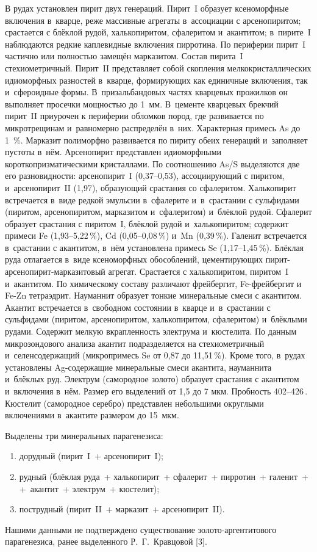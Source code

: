В рудах установлен пирит двух генераций. Пирит~I образует ксеноморфные включения в~кварце, реже массивные агрегаты в~ассоциации с арсенопиритом; срастается с блёклой рудой, халькопиритом, сфалеритом и~акантитом; в~пирите~I наблюдаются редкие каплевидные включения пирротина. По периферии пирит~I частично или полностью замещён марказитом. Состав пирита~I стехиометричный. Пирит~II представляет собой скопления мелкокристаллических идиоморфных разностей в~кварце, формирующих как единичные включения, так и~сфероидные формы. В~призальбандовых частях кварцевых прожилков он выполняет просечки мощностью до 1~мм. В~цементе кварцевых брекчий пирит~II приурочен к периферии обломков пород, где развивается по микротрещинам и~равномерно распределён в~них. Характерная примесь As до 1~\%. Марказит полиморфно развивается по пириту обеих генераций и~заполняет пустоты в~нём. Арсенопирит представлен идиоморфными короткопризматическими кристаллами. По соотношению As/S выделяются две его разновидности: арсенопирит~I (0,37--0,53), ассоциирующий с пиритом, и~арсенопирит~II (1,97), образующий срастания со сфалеритом. Халькопирит встречается в~виде редкой эмульсии в~сфалерите и~в~срастании с сульфидами (пиритом, арсенопиритом, марказитом и~сфалеритом) и~блёклой рудой. Сфалерит образует срастания с пиритом~I, блёклой рудой и~халькопиритом; содержит примеси Fe (1,93--5,22\,\%), Cd (0,05--0,08\,\%) и~Mn (0,39\,\%). Галенит встречается в~срастании с акантитом, в~нём установлена примесь Se (1,17--1,45\,\%). Блёклая руда отлагается в~виде ксеноморфных обособлений, цементирующих пирит-арсенопирит-марказитовый агрегат. Срастается с халькопиритом, пиритом~I и~акантитом. По химическому составу различают фрейбергит, Fe-фрейбергит и Fe-Zn тетраэдрит. Науманнит образует тонкие минеральные смеси с акантитом. Акантит встречается в~свободном состоянии в~кварце и~в~срастании с сульфидами (пиритом, арсенопиритом, халькопиритом, сфалеритом) и~блёклыми рудами. Содержит мелкую вкрапленность электрума и~кюстелита. По данным микрозондового анализа акантит подразделяется на стехиометричный и~селенсодержащий (микропримесь Se от 0,87 до 11,51\,\%). Кроме того, в~рудах установлены Ag-содержащие минеральные смеси акантита, науманнита и~блёклых руд. Электрум (самородное золото) образует срастания с акантитом и~включения в~нём. Размер его выделений от 1,5 до 7 мкм. Пробность 402--426\,\permil. Кюстелит (самородное серебро) представлен небольшими округлыми включениями в~акантите размером до 15~мкм.

Выделены три минеральных парагенезиса:
\begin{enumerate}[noitemsep]\vspace{-6pt}
  \item дорудный (пирит~I~+ арсенопирит~I);
  \item рудный (блёклая руда~+ халькопирит~+ сфалерит~+ пирротин~+ галенит~+\\+~акантит~+ электрум~+ кюстелит);
  \item пострудный (пирит~II~+ марказит~+ арсенопирит~II).
\end{enumerate}
 \vspace{-6pt}Нашими данными не подтверждено существование золото-аргентитового парагенезиса, ранее выделенного Р.~Г.~Кравцовой [3].

